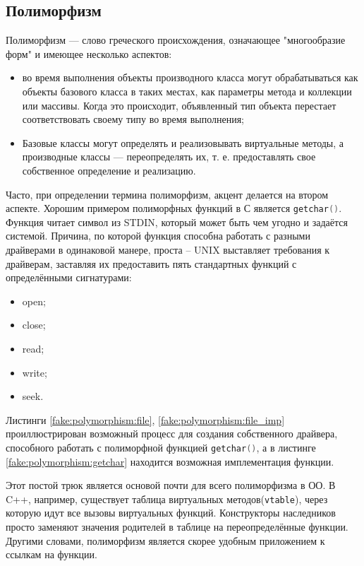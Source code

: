 \subsection{Полиморфизм}
\label{sec:polymorphism}

Полиморфизм — слово греческого происхождения, означающее "многообразие форм" и имеющее несколько аспектов\cite{microsoft:poly}:
\begin{itemize}
	\item во время выполнения объекты производного класса могут обрабатываться как объекты базового класса в таких местах, как параметры метода и коллекции или массивы. Когда это происходит, объявленный тип объекта перестает соответствовать своему типу во время выполнения;
	\item Базовые классы могут определять и реализовывать виртуальные методы, а производные классы — переопределять их, т. е. предоставлять свое собственное определение и реализацию.
\end{itemize}

Часто, при определении термина полиморфизм, акцент делается на втором аспекте. Хорошим примером полиморфных функций в С является \lstinline[language=C]{getchar()}. Функция читает символ из STDIN, который может быть чем угодно и задаётся системой. Причина, по которой функция способна работать с разными драйверами в одинаковой манере, проста -- UNIX выставляет требования к драйверам, заставляя их предоставить пять стандартных функций с определёнными сигнатурами: 
\begin{itemize}
	\item open;
	\item close;
	\item read;
	\item write;
	\item seek.
\end{itemize}

Листинги \ref{fake:polymorphism:file}, \ref{fake:polymorphism:file_imp} проиллюстрирован возможный процесс для создания собственного драйвера, способного работать с полиморфной функцией \lstinline[language=C]{getchar()}, а в листинге \ref{fake:polymorphism:getchar} находится возможная имплементация функции.

Этот постой трюк является основой почти для всего полиморфизма в ОО. В C++, например, существует таблица виртуальных методов(\texttt{vtable}), через которую идут все вызовы виртуальных функций. Конструкторы наследников просто заменяют значения родителей в таблице на переопределённые функции. Другими словами, полиморфизм является скорее удобным приложением к ссылкам на функции.
